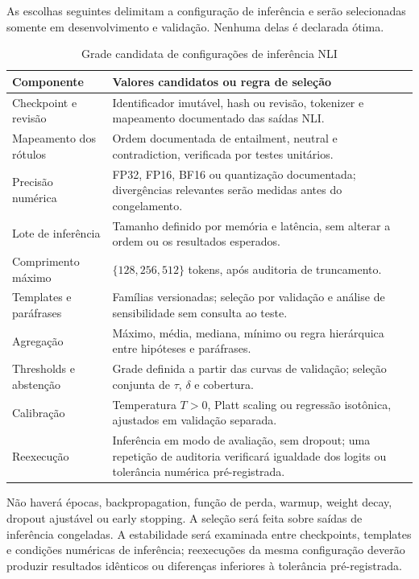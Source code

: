As escolhas seguintes delimitam a configuração de inferência e serão selecionadas somente em desenvolvimento e validação. Nenhuma delas é declarada ótima.

\begin{table}[htbp]
\centering
\caption{Grade candidata de configurações de inferência NLI}
\label{tab:configuracao-inferencia-nli}
\begin{tabular}{|p{}|p{}|}
\hline
\textbf{Componente} & \textbf{Valores candidatos ou regra de seleção} \\
\hline
Checkpoint e revisão & Identificador imutável, hash ou revisão, tokenizer e mapeamento documentado das saídas NLI. \\
\hline
Mapeamento dos rótulos & Ordem documentada de entailment, neutral e contradiction, verificada por testes unitários. \\
\hline
Precisão numérica & FP32, FP16, BF16 ou quantização documentada; divergências relevantes serão medidas antes do congelamento. \\
\hline
Lote de inferência & Tamanho definido por memória e latência, sem alterar a ordem ou os resultados esperados. \\
\hline
Comprimento máximo & \(\{128,256,512\}\) tokens, após auditoria de truncamento. \\
\hline
Templates e paráfrases & Famílias versionadas; seleção por validação e análise de sensibilidade sem consulta ao teste. \\
\hline
Agregação & Máximo, média, mediana, mínimo ou regra hierárquica entre hipóteses e paráfrases. \\
\hline
Thresholds e abstenção & Grade definida a partir das curvas de validação; seleção conjunta de \(\tau\), \(\delta\) e cobertura. \\
\hline
Calibração & Temperatura \(T>0\), Platt scaling ou regressão isotônica, ajustados em validação separada. \\
\hline
Reexecução & Inferência em modo de avaliação, sem dropout; uma repetição de auditoria verificará igualdade dos logits ou tolerância numérica pré-registrada. \\
\hline
\end{tabular}
\end{table}

Não haverá épocas, backpropagation, função de perda, warmup, weight decay, dropout ajustável ou early stopping. A seleção será feita sobre saídas de inferência congeladas. A estabilidade será examinada entre checkpoints, templates e condições numéricas de inferência; reexecuções da mesma configuração deverão produzir resultados idênticos ou diferenças inferiores à tolerância pré-registrada.


